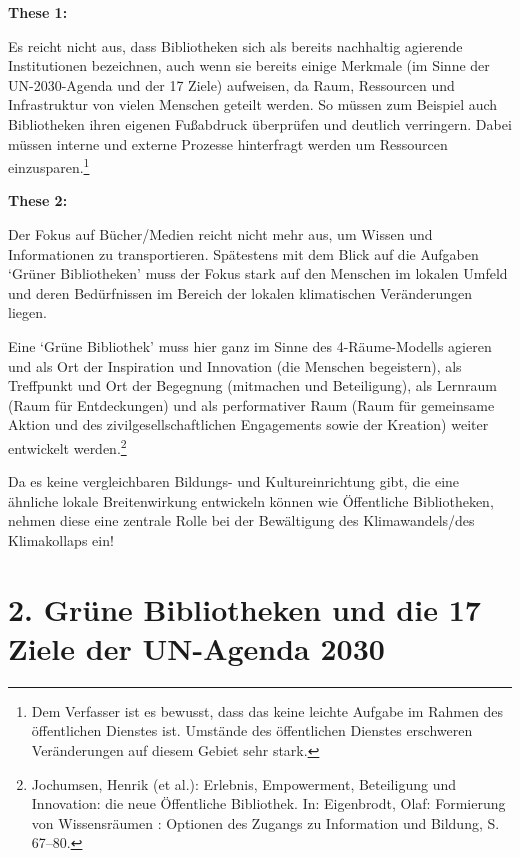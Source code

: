 \documentclass[a4paper,
fontsize=11pt,
oneside,
numbers=noperiodatend,
parskip=half-,
bibliography=totoc,
final
]{scrartcl}
\begin{document}
\textbf{These 1:}

Es reicht nicht aus, dass Bibliotheken sich als bereits nachhaltig
agierende Institutionen bezeichnen, auch wenn sie bereits einige
Merkmale (im Sinne der UN-2030-Agenda und der 17 Ziele) aufweisen, da
Raum, Ressourcen und Infrastruktur von vielen Menschen geteilt werden.
So müssen zum Beispiel auch Bibliotheken ihren eigenen Fußabdruck
überprüfen und deutlich verringern. Dabei müssen interne und externe
Prozesse hinterfragt werden um Ressourcen einzusparen.\footnote{Dem
  Verfasser ist es bewusst, dass das keine leichte Aufgabe im Rahmen des
  öffentlichen Dienstes ist. Umstände des öffentlichen Dienstes
  erschweren Veränderungen auf diesem Gebiet sehr stark.}

\textbf{These 2:}

Der Fokus auf Bücher/Medien reicht nicht mehr aus, um Wissen und
Informationen zu transportieren. Spätestens mit dem Blick auf die
Aufgaben \enquote*{Grüner Bibliotheken} muss der Fokus stark auf den
Menschen im lokalen Umfeld und deren Bedürfnissen im Bereich der lokalen
klimatischen Veränderungen liegen.

Eine \enquote*{Grüne Bibliothek} muss hier ganz im Sinne des
4-Räume-Modells agieren und als Ort der Inspiration und Innovation (die
Menschen begeistern), als Treffpunkt und Ort der Begegnung (mitmachen
und Beteiligung), als Lernraum (Raum für Entdeckungen) und als
performativer Raum (Raum für gemeinsame Aktion und des
zivilgesellschaftlichen Engagements sowie der Kreation) weiter
entwickelt werden.\footnote{Jochumsen, Henrik (et al.): Erlebnis,
  Empowerment, Beteiligung und Innovation: die neue Öffentliche
  Bibliothek. In: Eigenbrodt, Olaf: Formierung von Wissensräumen :
  Optionen des Zugangs zu Information und Bildung, S. 67--80.}

Da es keine vergleichbaren Bildungs- und Kultureinrichtung gibt, die
eine ähnliche lokale Breitenwirkung entwickeln können wie Öffentliche
Bibliotheken, nehmen diese eine zentrale Rolle bei der Bewältigung des
Klimawandels/des Klimakollaps ein!

\hypertarget{gruxfcne-bibliotheken-und-die-17-ziele-der-un-agenda-2030}{%
\section{2. Grüne Bibliotheken und die 17 Ziele der UN-Agenda
2030}\label{gruxfcne-bibliotheken-und-die-17-ziele-der-un-agenda-2030}}
\end{document}
